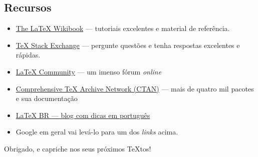 \documentclass{beamer}
\begin{document}
\subsection{Recursos}
\begin{frame}{\insertsubsection}
\begin{itemize}
  \item \href{http://en.wikibooks.org/wiki/LaTeX}{The \LaTeX{} Wikibook} --- tutoriais excelentes e material de referência.
  \item \href{http://tex.stackexchange.com/}{\TeX{} Stack Exchange} --- pergunte questões e tenha respostas excelentes e rápidas.
  \item \href{http://www.latex-community.org/}{\LaTeX{} Community} --- um imenso fórum \emph{online}
  \item \href{http://ctan.org/}{Comprehensive \TeX{} Archive Network (CTAN)} --- mais de quatro mil pacotes e sua documentação
  \item \href{http://latexbr.blogspot.com.br/}{\LaTeX{} BR --- blog com dicas em português}
  \item Google em geral vai levá-lo para um dos \emph{links} acima.
\end{itemize}
\end{frame}

\begin{frame}
\begin{center}
Obrigado, e capriche nos seus próximos  \TeX{}tos!
\end{center}
\end{frame}
\end{document}
